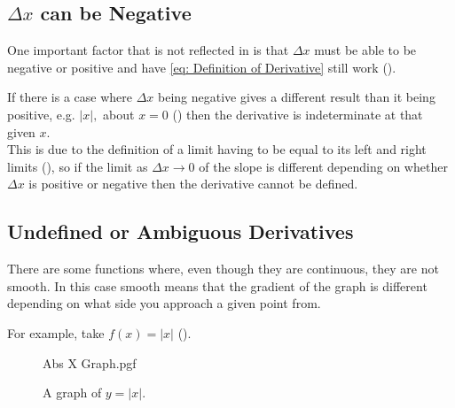 \documentclass[main.tex]{subfiles}
\begin{document}
            \newpage

            \subsection{$\Delta x$ can be Negative}
                \label{subsec: Delta x can be Negative}

                One important factor that is not reflected in  is that $\Delta x$ must be able to be negative or positive and have \eqref{eq: Definition of Derivative} still work ().

                If there is a case where $\Delta x$ being negative gives a different result than it being positive, e.g. $|x|,$ about $x=0$ () then the derivative is indeterminate at that given $x$.\\
                This is due to the definition of a limit having to be equal to its left and right limits (), so if the limit as $\Delta x \to 0$ of the slope is different depending on whether $\Delta x$ is positive or negative then the derivative cannot be defined.

            \subsection{Undefined or Ambiguous Derivatives}
                \label{subsec: Undefined or Ambiguous Derivatives}

                There are some functions where, even though they are continuous, they are not smooth. In this case smooth means that the gradient of the graph is different depending on what side you approach a given point from.

                For example, take $f(x) = |x|$ ().
                \begin{figure}[!h]
                    \centering
                    \scalebox{0.7}
                    {
                        \begin{adjustbox}{clip,trim=15mm 35mm 15mm 10mm}
                            {{Abs X Graph.pgf}}
                        \end{adjustbox}
                    }

                    \caption{A graph of $y=|x|$.}
                    \label{fig: Abs X}
                \end{figure}
\end{document}
